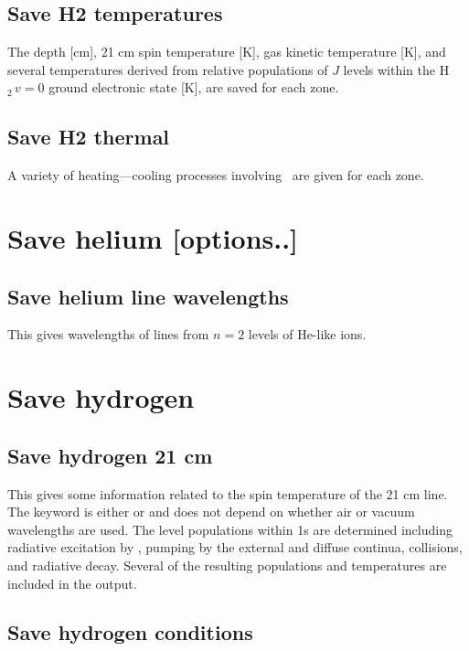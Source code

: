 \subsection{Save H2 temperatures}

The depth [cm], 21 cm spin temperature [K], gas kinetic temperature [K],
and several temperatures derived from relative populations of $J$ levels within
the H$_2\, v=0$ ground  electronic state [K], are saved for each zone.

\subsection{Save H2 thermal}

A variety of heating---cooling processes involving \htwo\ are given
for each zone.

\section{Save helium [options..]}

\subsection{Save helium line wavelengths}

This gives wavelengths of lines from $n=2$ levels of He-like ions.

\section{Save hydrogen}

\subsection{Save hydrogen 21 cm}

This gives some information related to the spin temperature of the 21
cm line.
The keyword is either \cdCommand{21 cm} or \cdCommand{21cm} and does
not depend on whether air or vacuum wavelengths are used.
The level populations
within 1s are determined including radiative excitation by \la, pumping by
the external and diffuse continua, collisions, and radiative decay.  Several
of the resulting populations and temperatures are included in the output.

\subsection{Save hydrogen conditions}

